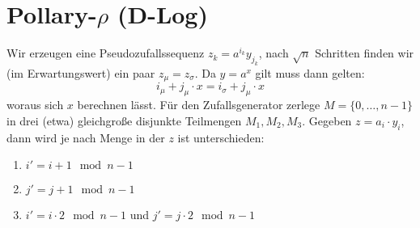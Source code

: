 \section{Pollary-$\rho$ (D-Log)}
Wir erzeugen eine Pseudozufallssequenz $z_k = a^{i_k} y_{j_k}$, nach $\sqrt{n}$ Schritten
finden wir (im Erwartungswert) ein paar $z_\mu = z_\sigma$. Da $y=a^x$ gilt muss dann gelten:
\begin{equation}
    i_\mu + j_\mu \cdot x = i_\sigma + j_\mu \cdot x
\end{equation}
woraus sich $x$ berechnen lässt. Für den Zufallsgenerator zerlege $M=\{0, \ldots, n-1\}$
in drei (etwa) gleichgroße disjunkte Teilmengen $M_1, M_2, M_3$.
Gegeben $z=a_i \cdot y_i$, dann wird je nach Menge in der $z$ ist unterschieden:
\begin{enumerate}
    \item
        $i' = i + 1 \mod n-1$
    \item
        $j' = j + 1 \mod n-1$
    \item
        $i' = i \cdot 2 \mod n-1$ und $j' = j \cdot 2 \mod n-1$
\end{enumerate}
